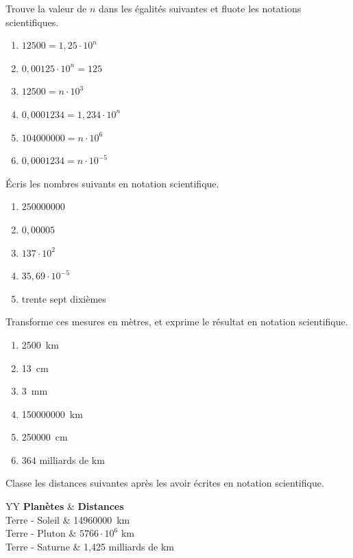 \documentclass[../math2.tex]{subfiles}
\begin{document}
\begin{exercise}
	Trouve la valeur de $n$ dans les égalités suivantes et fluote les notations
	scientifiques.
	\begin{enumerate} [cols=2]
		\item  $12500=1,25\cdot 10^n$
		\item  $0,00125\cdot 10^n=125$
		\item  $12500=n\cdot 10^3$
		\item  $0,0001234=1,234\cdot 10^n$
		\item  $104000000=n\cdot 10^6$
		\item  $0,0001234=n\cdot 10^{-5}$
	\end{enumerate}
\end{exercise}

\begin{exercise}
	Écris les nombres suivants en notation scientifique.
	\begin{enumerate}[cols=2]
		\item  $250000000$
		\item  $0,00005$
		\item  $137\cdot 10^2$
		\item  $35,69\cdot 10^{-5}$
		\item  trente sept dixièmes
	\end{enumerate}
\end{exercise}

\begin{exercise}
	Transforme ces mesures en mètres, et exprime le résultat en notation scientifique.
	\begin{enumerate}[cols=2]
		\item  \SI{2500}{km}
		\item  \SI{13}{cm}
		\item  \SI{3}{mm}
		\item  \SI{150000000}{km}
		\item  \SI{250000}{cm}
		\item  364 milliards de km
	\end{enumerate}
\end{exercise}

\begin{exercise}
	Classe les distances suivantes après les avoir écrites en notation scientifique.

	\begin{tabularx}{\linewidth}{YY}%
		\toprule
		\textbf{Planètes} & \textbf{Distances}    \\
		\midrule
		Terre - Soleil    & \SI{14960000}{km}     \\
		Terre - Pluton    & $5766\cdot 10^6$ km   \\
		Terre - Saturne   & 1,425 milliards de km \\
		\bottomrule
	\end{tabularx}
\end{exercise}
\end{document}
